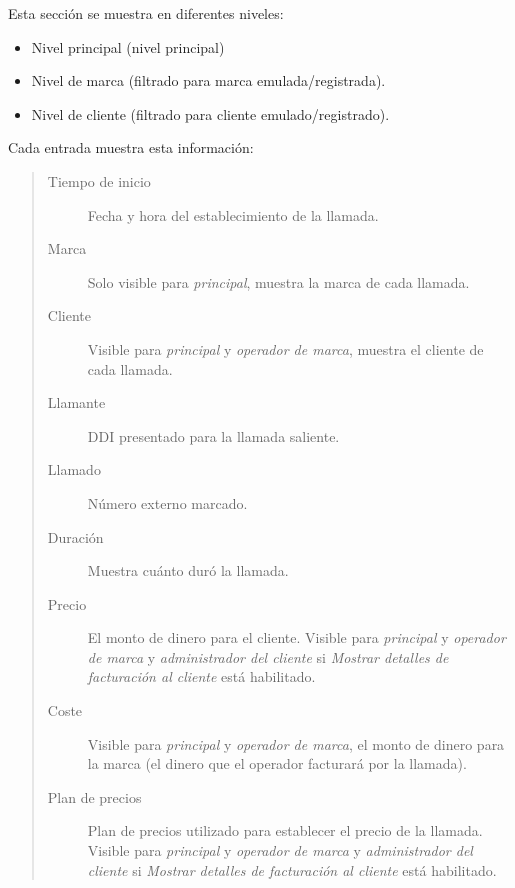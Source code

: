 \documentclass[letterpaper,10pt,spanish]{sphinxmanual}
\begin{document}
Esta sección se muestra en diferentes niveles:
\begin{itemize}
\item {} 
Nivel principal (nivel principal)

\item {} 
Nivel de marca (filtrado para marca emulada/registrada).

\item {} 
Nivel de cliente (filtrado para cliente emulado/registrado).

\end{itemize}

Cada entrada muestra esta información:
\begin{quote}
\begin{description}
\item[{Tiempo de inicio}] \leavevmode
Fecha y hora del establecimiento de la llamada.

\item[{Marca}] \leavevmode
Solo visible para \emph{principal}, muestra la marca de cada llamada.

\item[{Cliente}] \leavevmode
Visible para \emph{principal} y \emph{operador de marca}, muestra el cliente de cada llamada.

\item[{Llamante}] \leavevmode
DDI presentado para la llamada saliente.

\item[{Llamado}] \leavevmode
Número externo marcado.

\item[{Duración}] \leavevmode
Muestra cuánto duró la llamada.

\item[{Precio}] \leavevmode
El monto de dinero para el cliente. Visible para \emph{principal} y \emph{operador de marca} y \emph{administrador del cliente} si \emph{Mostrar detalles de facturación al cliente} está habilitado.

\item[{Coste}] \leavevmode
Visible para \emph{principal} y \emph{operador de marca}, el monto de dinero para la marca (el dinero que el operador facturará por la llamada).

\item[{Plan de precios}] \leavevmode
Plan de precios utilizado para establecer el precio de la llamada. Visible para \emph{principal} y \emph{operador de marca} y \emph{administrador del cliente} si \emph{Mostrar detalles de facturación al cliente} está habilitado.


\end{description}
\end{quote}
\end{document}
